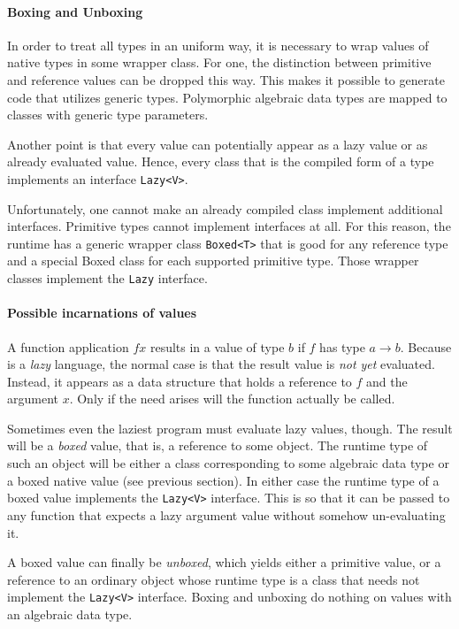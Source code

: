 \paragraph*{Boxing and Unboxing}

In order to treat all \frege{} types in an uniform way, it is necessary to wrap values of native types in some wrapper class. For one, the distinction between primitive and reference values can be dropped this way. This makes it possible to generate \java{} code that utilizes generic types. Polymorphic algebraic data types are mapped to \java{} classes with generic type parameters.

Another point is that every \frege{} value can potentially appear as a lazy value or as already evaluated value. Hence, every \java{} class that is the compiled form of a \frege{} type implements an interface \texttt{Lazy<V>}.

Unfortunately, one cannot make an already compiled \java{} class implement additional interfaces. Primitive types cannot implement interfaces at all. For this reason, the \frege{} runtime has a generic wrapper class \texttt{Boxed<T>} that is good for any reference type and a special Boxed class for each supported primitive type. Those wrapper classes implement the \texttt{Lazy} interface.

\paragraph*{Possible incarnations of \frege{} values}

A function application $f x$ results in a value of type $b$ if $f$ has type $a \rightarrow b$. Because \frege{} is a \emph{lazy} language, the normal case is that the result value is \emph{not yet} evaluated. Instead, it appears as a data structure that holds a reference to $f$ and the argument $x$. Only if the need arises will the function actually be called. 

Sometimes even the laziest program must evaluate lazy values, though. The result will be a \emph{boxed} value, that is, a reference to some \java{} object. The runtime type of such an object will be either a \java{} class corresponding to some \frege{} algebraic data type or a boxed native value (see previous section). In either case the runtime type of a boxed value implements the \texttt{Lazy<V>} interface. This is so that it can be passed to any function that expects a lazy argument value without somehow un-evaluating it.

A boxed value can finally be \emph{unboxed}, which yields either a primitive value, or a reference to an ordinary \java{} object whose runtime type is a \java{} class that needs not implement the \texttt{Lazy<V>} interface. Boxing and unboxing do nothing on values with an algebraic data type.

